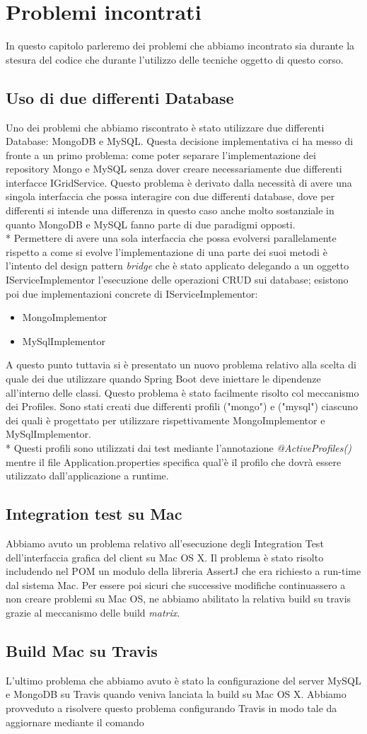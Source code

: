 \chapter{Problemi incontrati}
In questo capitolo parleremo dei problemi che abbiamo incontrato sia durante la stesura del codice che durante l'utilizzo delle tecniche oggetto di questo corso.
\section{Uso di due differenti Database}
Uno dei problemi che abbiamo riscontrato \`e stato utilizzare due differenti Database: MongoDB e MySQL. Questa decisione implementativa ci ha messo di fronte a un primo problema: come poter separare l'implementazione dei repository Mongo e MySQL senza dover creare necessariamente due differenti interfacce IGridService. Questo problema \`e derivato dalla necessit\`a di avere una singola interfaccia che possa interagire con due differenti database, dove per differenti si intende una differenza in questo caso anche molto sostanziale in quanto MongoDB e MySQL fanno parte di due paradigmi opposti.\\*
Permettere di avere una sola interfaccia che possa evolversi parallelamente rispetto a come si evolve l'implementazione di una parte dei suoi metodi \`e l'intento del design pattern \emph{bridge} che \`e stato applicato delegando a un oggetto IServiceImplementor l'esecuzione delle operazioni CRUD sui database; esistono poi due implementazioni concrete di IServiceImplementor:
\begin{itemize}
	\item MongoImplementor
	\item MySqlImplementor
\end{itemize}
A questo punto tuttavia si \`e presentato un nuovo problema relativo alla scelta di quale dei due utilizzare quando Spring Boot deve iniettare le dipendenze all'interno delle classi. Questo problema \`e stato facilmente risolto col meccanismo dei Profiles. Sono stati creati due differenti profili ("mongo") e ("mysql") ciascuno dei quali \`e progettato per utilizzare rispettivamente MongoImplementor e MySqlImplementor.\\*
Questi profili sono utilizzati dai test mediante l'annotazione \emph{@ActiveProfiles()} mentre il file Application.properties specifica qual'\`e il profilo che dovr\`a essere utilizzato dall'applicazione a runtime.
\section{Integration test su Mac}
Abbiamo avuto un problema relativo all'esecuzione degli Integration Test dell'interfaccia grafica del client su Mac OS X. Il problema \`e stato risolto includendo nel POM un modulo della libreria AssertJ che era richiesto a run-time dal sistema Mac. Per essere poi sicuri che successive modifiche continuassero a non creare problemi su Mac OS, ne abbiamo abilitato la relativa build su travis grazie al meccanismo delle build \emph{matrix}.
\section{Build Mac su Travis}
L'ultimo problema che abbiamo avuto \`e stato la configurazione del server MySQL e MongoDB su Travis quando veniva lanciata la build su Mac OS X. Abbiamo provveduto a risolvere questo problema configurando Travis in modo tale da aggiornare mediante il comando
